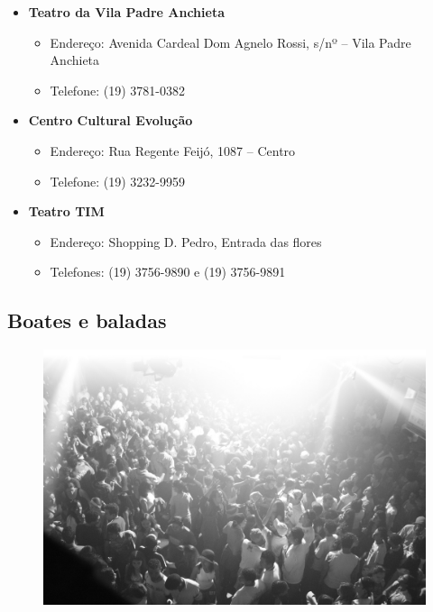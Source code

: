 \begin{itemize}
\item  \textbf{Teatro da Vila Padre Anchieta}
\begin{itemize}
\item  Endereço: Avenida Cardeal Dom Agnelo Rossi, s/nº -- Vila Padre Anchieta
\item  Telefone: (19) 3781-0382
\end{itemize}
\end{itemize}

\begin{itemize}
\item  \textbf{Centro Cultural Evolução}
\begin{itemize}
\item  Endereço: Rua Regente Feijó, 1087 -- Centro
\item  Telefone: (19) 3232-9959
\end{itemize}
\end{itemize}

\begin{itemize}
\item  \textbf{Teatro TIM}
\begin{itemize}
\item  Endereço: Shopping D. Pedro, Entrada das flores
\item  Telefones: (19) 3756-9890 e (19) 3756-9891
\end{itemize}
\end{itemize}

\subsection{Boates e baladas}

\begin{figure}[hb!]
    \centering
    \includegraphics[scale=0.15,keepaspectratio=true]{img/imgs/7-diversao/-053.jpg}
\end{figure}

